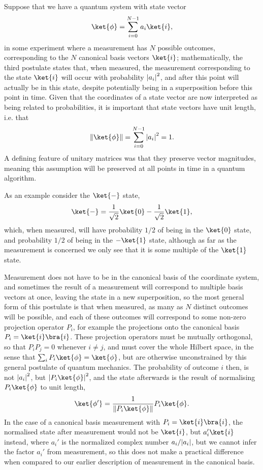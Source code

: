 Suppose that we have a quantum system with state vector
\[\ket{\phi} = \sum_{i=0}^{N-1} a_i\ket{i},\]
in some experiment where a measurement has $N$ possible outcomes, corresponding to the $N$ canonical basis vectors $\ket{i}$; mathematically, the third postulate states that, when measured, the measurement corresponding to the state $\ket{i}$ will occur with probability $\left| a_i \right|^2$, and after this point will actually be in this state, despite potentially being in a superposition before this point in time. Given that the coordinates of a state vector are now interpreted as being related to probabilities, it is important that state vectors have unit length, i.e. that
\[\norm{\ket{\phi}} = \sum_{i=0}^{N-1} \ord{a_i}^2 = 1.\]
A defining feature of unitary matrices was that they preserve vector magnitudes, meaning this assumption will be preserved at all points in time in a quantum algorithm.

As an example consider the $\ket{-}$ state,
\[\ket{-}=\frac{1}{\sqrt{2}}\ket{0} - \frac{1}{\sqrt{2}}\ket{1},\]
which, when measured, will have probability $1/2$ of being in the $\ket{0}$ state, and probability $1/2$ of being in the $-\ket{1}$ state, although as far as the measurement is concerned we only see that it is some multiple of the $\ket{1}$ state.

Measurement does not have to be in the canonical basis of the coordinate system, and sometimes the result of a measurement will correspond to multiple basis vectors at once, leaving the state in a new superposition, so the most general form of this postulate is that when measured, as many as $N$ distinct outcomes will be possible, and each of these outcomes will correspond to some non-zero projection operator $P_i$, for example the projections onto the canonical basis $P_i = \ket{i}\bra{i}$. These projection operators must be mutually orthogonal, so that $P_iP_j = 0$ whenever $i \neq j$, and must cover the whole Hilbert space, in the sense that $\sum_i P_i\ket{\phi} = \ket{\phi}$, but are otherwise unconstrained by this general postulate of quantum mechanics. The probability of outcome $i$ then, is not $\left| a_i \right|^2$, but $\ord{P_i\ket{\phi}}^2$, and the state afterwards is the result of normalising $P_i \ket{\phi}$ to unit length,
\[\ket{\phi'} = \frac{1}{\norm{P_i \ket{\phi}}}P_i\ket{\phi}.\]
In the case of a canonical basis measurement with $P_i = \ket{i}\bra{i}$, the normalised state after measurement would not be $\ket{i}$, but $a_i'\ket{i}$ instead, where $a_i'$ is the normalized complex number ${a_i}/{\left| a_i \right|}$, but we cannot infer the factor $a_i'$ from measurement, so this does not make a practical difference when compared to our earlier description of measurement in the canonical basis.

